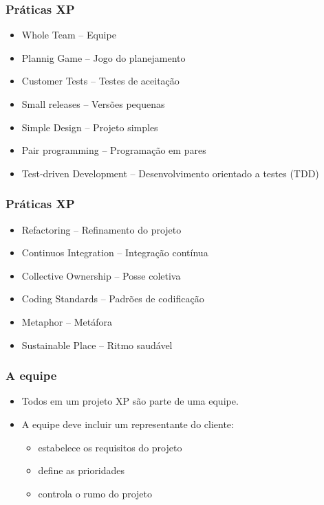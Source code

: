 \begin{frame}
 \frametitle{Práticas XP}
 \begin{itemize}
  \item Whole Team – Equipe
  \item Plannig Game – Jogo do planejamento
  \item Customer Tests – Testes de aceitação
  \item  Small releases – Versões pequenas
  \item  Simple Design – Projeto simples
  \item Pair programming – Programação em pares
  \item Test-driven Development – Desenvolvimento orientado a testes (TDD)
 \end{itemize}

\end{frame}

\begin{frame}
 \frametitle{Práticas XP}
 \begin{itemize}
  \item Refactoring – Refinamento do projeto
  \item Continuos Integration – Integração contínua
  \item Collective Ownership – Posse coletiva
  \item Coding Standards – Padrões de codificação
  \item Metaphor – Metáfora
  \item Sustainable Place – Ritmo saudável
 \end{itemize}
\end{frame}

\begin{frame}
 \frametitle{A equipe}
 \begin{itemize}
  \item  Todos em um projeto XP são parte de uma equipe.
  \item A equipe deve incluir um representante do cliente:
  \begin{itemize}
   \item estabelece os requisitos do projeto
   \item define as prioridades
   \item controla o rumo do projeto
  \end{itemize}
 \end{itemize}
\end{frame}

